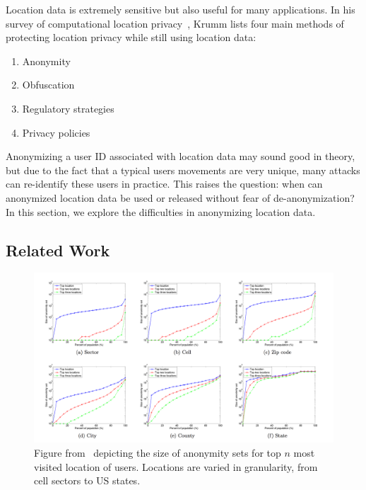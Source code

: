 Location data is extremely sensitive but also useful for many applications.
In his survey of computational location privacy~\cite{krumm2009survey}, Krumm lists four main methods of protecting location privacy while still using location data:
\begin{enumerate}
  \item Anonymity
  \item Obfuscation
  \item Regulatory strategies
  \item Privacy policies
\end{enumerate}
Anonymizing a user ID associated with location data may sound good in theory, but due to the fact that a typical users movements are very unique, many attacks can re-identify these users in practice.
This raises the question: when can anonymized location data be used or released without fear of de-anonymization?
In this section, we explore the difficulties in anonymizing location data.


\subsection{Related Work}

\begin{figure}[t]
  \centering
  \includegraphics[width=\linewidth]{fig/zang_bolot.png}
  \caption{Figure from~\cite{Zang:2011hk} depicting the size of anonymity sets for top $n$ most visited location of users.
           Locations are varied in granularity, from cell sectors to US states.}
  \label{fig:zang_bolot}
\end{figure}

